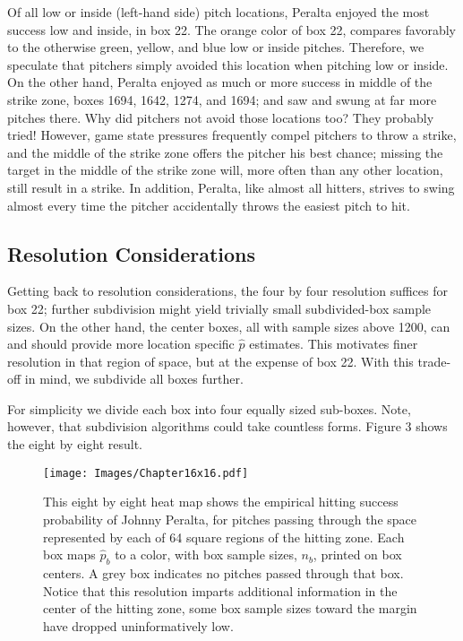 Of all low or inside (left-hand side) pitch locations, Peralta enjoyed the most success low and inside, in box 22. The orange color of box 22, compares favorably to the otherwise green, yellow, and blue low or inside pitches. Therefore, we speculate that pitchers simply avoided this location when pitching low or inside. On the other hand, Peralta enjoyed as much or more success in middle of the strike zone, boxes 1694, 1642, 1274, and 1694; and saw and swung at far more pitches there. Why did pitchers not avoid those locations too? They probably tried! However, game state pressures frequently compel pitchers to throw a strike, and the middle of the strike zone offers the pitcher his best chance; missing the target in the middle of the strike zone will, more often than any other location, still result in a strike. In addition, Peralta, like almost all hitters, strives to swing almost every time the pitcher accidentally throws the easiest pitch to hit.

\subsection{Resolution Considerations} %

Getting back to resolution considerations, the four by four resolution suffices for box 22; further subdivision might yield trivially small subdivided-box sample sizes. On the other hand, the center boxes, all with sample sizes above 1200, can and should provide more location specific $\hat{p}$ estimates. This motivates finer resolution in that region of space, but at the expense of box 22. With this trade-off in mind, we subdivide all boxes further. 

For simplicity we divide each box into four equally sized sub-boxes. Note, however, that subdivision algorithms could take countless forms. Figure 3 shows the eight by eight result.
        \begin{figure}[H]
      	\centering
      	\texttt{[image: Images/Chapter16x16.pdf]} 
      	\caption{This eight by eight heat map shows the empirical hitting success probability of Johnny Peralta, for pitches passing through the space represented by each of 64 square regions of the hitting zone. Each box maps $\hat{p}_{b}$ to a color, with box sample sizes, $n_{b}$, printed on box centers. A grey box indicates no pitches passed through that box. Notice that this resolution imparts additional information in the center of the hitting zone, some box sample sizes toward the margin have dropped uninformatively low.}
      	\end{figure} 

